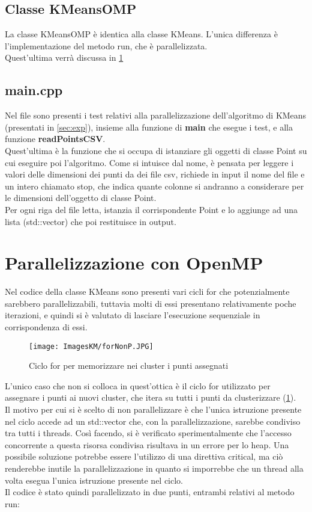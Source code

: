 \documentclass[10pt,twocolumn,letterpaper]{article}
\begin{document}
\subsection{Classe KMeansOMP}
La classe KMeansOMP è identica alla classe KMeans. L'unica differenza è l'implementazione del metodo run, che è parallelizzata.\\
Quest'ultima verrà discussa in \cref{sec:par}

\subsection{main.cpp}
Nel file sono presenti i test relativi alla parallelizzazione dell’algoritmo di KMeans (presentati in \cref{sec:exp}), insieme alla funzione di \textbf{main} che esegue i test, e alla funzione \textbf{readPointsCSV}.\\
Quest'ultima è la funzione che si occupa di istanziare gli oggetti di classe Point su cui eseguire poi l'algoritmo. Come si intuisce dal nome, è pensata per leggere i valori delle dimensioni dei punti da dei file csv, richiede in input il nome del file e un intero chiamato stop, che indica quante colonne si andranno a considerare per le dimensioni dell'oggetto di classe Point.\\
Per ogni riga del file letta, istanzia il corrispondente Point e lo aggiunge ad una lista (std::vector) che poi restituisce in output.


\section{Parallelizzazione con OpenMP}
\label{sec:par}
Nel codice della classe KMeans sono presenti vari cicli for che potenzialmente sarebbero parallelizzabili, tuttavia molti di essi presentano relativamente poche iterazioni, e quindi si è valutato di lasciare l'esecuzione sequenziale in corrispondenza di essi.

\begin{figure}[h]
    \centering
    \texttt{[image: ImagesKM/forNonP.JPG]}
    \caption{Ciclo for per memorizzare nei cluster i punti assegnati}
    \label{fig:forNP}
\end{figure}

L'unico caso che non si colloca in quest'ottica è il ciclo for utilizzato per assegnare i punti ai nuovi cluster, che itera su tutti i punti da clusterizzare (\cref{fig:forNP}).\\
Il motivo per cui si è scelto di non parallelizzare è che l'unica istruzione presente nel ciclo accede ad un std::vector che, con la parallelizzazione, sarebbe condiviso tra tutti i threads. Così facendo, si è verificato sperimentalmente che l'accesso concorrente a questa risorsa condivisa risultava in un errore per lo heap. Una possibile soluzione potrebbe essere l'utilizzo di una direttiva critical, ma ciò renderebbe inutile la parallelizzazione in quanto si imporrebbe che un thread alla volta esegua l'unica istruzione presente nel ciclo.\\
Il codice è stato quindi parallelizzato in due punti, entrambi relativi al metodo run:
\end{document}
